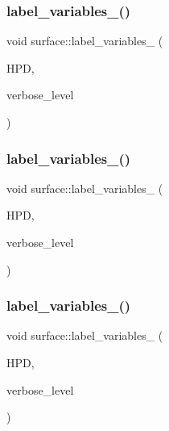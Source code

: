 \mbox{\label{classsurface_a060c114ceb886a5218fc1bb3ff39aeda}} 
\subsubsection{\texorpdfstring{label\+\_\+variables\+\_()}{label\_variables\_27()}}
{\footnotesize\ttfamily void surface\+::label\+\_\+variables\+\_ (\begin{DoxyParamCaption}\item[{\mbox{\hyperlink{classhomogeneous__polynomial__domain}{homogeneous\+\_\+polynomial\+\_\+domain}} $\ast$}]{H\+PD,  }\item[{\mbox{\hyperlink{galois_8h_a09fddde158a3a20bd2dcadb609de11dc}{I\+NT}}}]{verbose\+\_\+level }\end{DoxyParamCaption})}

\mbox{\label{classsurface_adff9ddc650565dbcef50377e654e36e0}} 
\subsubsection{\texorpdfstring{label\+\_\+variables\+\_()}{label\_variables\_3()}}
{\footnotesize\ttfamily void surface\+::label\+\_\+variables\+\_ (\begin{DoxyParamCaption}\item[{\mbox{\hyperlink{classhomogeneous__polynomial__domain}{homogeneous\+\_\+polynomial\+\_\+domain}} $\ast$}]{H\+PD,  }\item[{\mbox{\hyperlink{galois_8h_a09fddde158a3a20bd2dcadb609de11dc}{I\+NT}}}]{verbose\+\_\+level }\end{DoxyParamCaption})}

\mbox{\label{classsurface_a84f8ff28e4d214a8ead89e25e623df3f}} 
\subsubsection{\texorpdfstring{label\+\_\+variables\+\_()}{label\_variables\_4()}}
{\footnotesize\ttfamily void surface\+::label\+\_\+variables\+\_ (\begin{DoxyParamCaption}\item[{\mbox{\hyperlink{classhomogeneous__polynomial__domain}{homogeneous\+\_\+polynomial\+\_\+domain}} $\ast$}]{H\+PD,  }\item[{\mbox{\hyperlink{galois_8h_a09fddde158a3a20bd2dcadb609de11dc}{I\+NT}}}]{verbose\+\_\+level }\end{DoxyParamCaption})}

